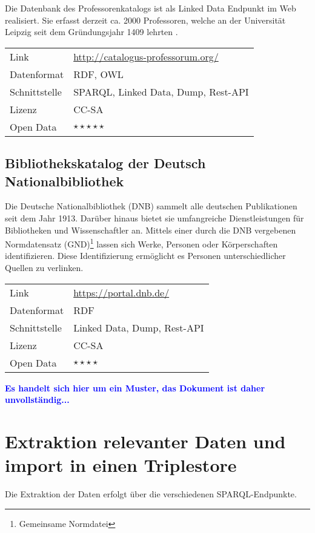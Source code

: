 \documentclass[parskip]{scrartcl}
\begin{document}
Die Datenbank des Professorenkatalogs ist als Linked Data Endpunkt im Web realisiert. Sie erfasst derzeit ca. 2000 Professoren, welche an der Universität Leipzig seit dem Gründungsjahr 1409 lehrten \cite{riechert_knowledge_2010}.

\begin{tabular}{l|p{9cm}}
	Link & \url{http://catalogus-professorum.org/} \\
 	Datenformat & RDF, OWL \\
 	Schnittstelle & SPARQL, Linked Data, Dump, Rest-API \\
 	Lizenz & CC-SA \\
 	Open Data & $\star\star\star\star\star$ \\
\end{tabular}

\subsection{Bibliothekskatalog der Deutsch Nationalbibliothek}

Die Deutsche Nationalbibliothek (DNB) sammelt alle deutschen Publikationen seit dem Jahr 1913. Darüber hinaus bietet sie umfangreiche Dienstleistungen für Bibliotheken und Wissenschaftler an. Mittels einer durch die DNB vergebenen Normdatensatz (GND)\footnote{Gemeinsame Normdatei} lassen sich Werke, Personen oder Körperschaften identifizieren. Diese Identifizierung ermöglicht es Personen unterschiedlicher Quellen zu verlinken.

\begin{tabular}{l|p{9cm}}
	Link & \url{https://portal.dnb.de/} \\
 	Datenformat & RDF \\
 	Schnittstelle & Linked Data, Dump, Rest-API \\
 	Lizenz & CC-SA \\
 	Open Data & $\star\star\star\star$ \\
\end{tabular}

\textcolor{blue}{\textbf{Es handelt sich hier um ein Muster, das Dokument ist daher unvollständig...}}

\section{Extraktion relevanter Daten und import in einen Triplestore }

Die Extraktion der Daten erfolgt über die verschiedenen SPARQL-Endpunkte.
\end{document}
